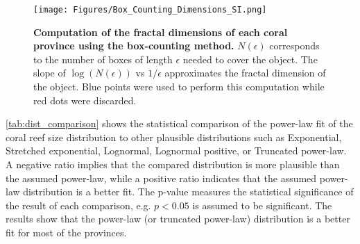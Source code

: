 \begin{figure}[H]
    \centering
    \texttt{[image: Figures/Box\_Counting\_Dimensions\_SI.png]}
    \caption[Computation of the fractal dimensions of each coral province
        using the box-counting method]{\textbf{Computation of the fractal
            dimensions of each coral province
            using the box-counting method.} $N(\epsilon)$ corresponds to the
        number
        of boxes
        of length $\epsilon$ needed to cover the object. The slope of
        $\log(N(\epsilon))$ vs $1/\epsilon$ approximates the fractal dimension
        of the
        object. Blue points were used to perform this computation while red
        dots were
        discarded.}
    \label{fig:Box_Counting_SI}
\end{figure}

\cref{tab:dist_comparison} shows the statistical comparison of the power-law
fit of the coral reef size distribution to other plausible distributions such
as Exponential, Stretched exponential, Lognormal, Lognormal positive, or
Truncated power-law. A negative ratio implies that the compared distribution is
more plausible than the assumed power-law, while a positive ratio indicates
that the assumed power-law distribution is a better fit. The p-value measures
the statistical significance of the result of each comparison, e.g. $p<0.05$
is assumed to be significant. The results show that the power-law (or truncated
power-law) distribution is a better fit for most of the provinces.

